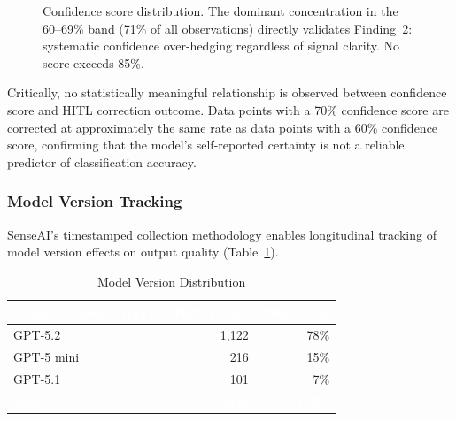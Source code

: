 \documentclass[11pt,a4paper]{article}
\begin{document}
\begin{figure}[H]
\centering
{}
\caption{Confidence score distribution. The dominant concentration in the 60--69\%
band (71\% of all observations) directly validates Finding~2: systematic confidence
over-hedging regardless of signal clarity. No score exceeds 85\%.}
\label{fig:confidence_bar}
\end{figure}

Critically, no statistically meaningful relationship is observed between confidence
score and HITL correction outcome. Data points with a 70\% confidence score are
corrected at approximately the same rate as data points with a 60\% confidence
score, confirming that the model's self-reported certainty is not a reliable predictor
of classification accuracy.

\subsubsection{Model Version Tracking}

SenseAI's timestamped collection methodology enables longitudinal tracking of model
version effects on output quality (Table~\ref{tab:model_versions}).

\begin{table}[H]
\centering
\caption{Model Version Distribution}
\label{tab:model_versions}
\renewcommand{\arraystretch}{1.3}
\begin{tabular}{lrr}
\toprule
\rowcolor{headerblue}
\textcolor{white}{\textbf{Model Version}} &
\textcolor{white}{\textbf{Approx.\ Data Points}} &
\textcolor{white}{\textbf{Proportion}} \\
\midrule
GPT-5.2    & 1{,}122 & 78\% \\
\rowcolor{rowgray}
GPT-5 mini &   216   & 15\% \\
GPT-5.1    &   101   &  7\% \\
\midrule
\rowcolor{headerblue}
\textcolor{white}{\textbf{Total}} &
\textcolor{white}{\textbf{1,439}} &
\textcolor{white}{\textbf{100\%}} \\
\bottomrule
\end{tabular}
\end{table}
\end{document}
